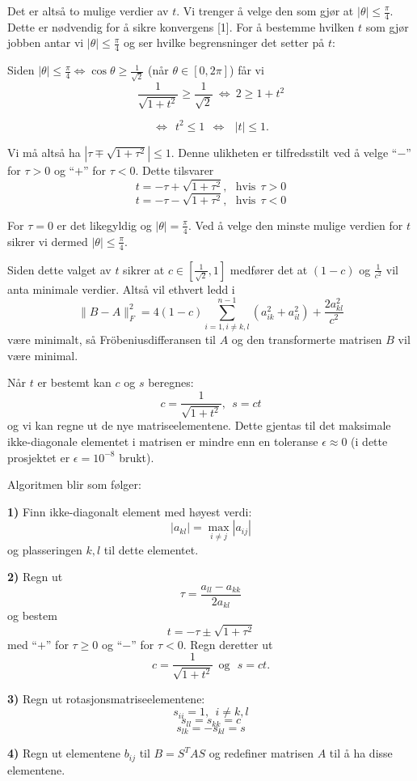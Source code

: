 \documentclass[norsk, 12pt]{article}
\newcommand{\f}{\frac}
\begin{document}
Det er altså to mulige verdier av $t$. Vi trenger å velge den som gjør at $|\theta|\leq\f{\pi}{4}$. Dette er nødvendig
for å sikre konvergens [1]. For å bestemme hvilken $t$ som gjør jobben antar vi $|\theta|\leq\f{\pi}{4}$ og ser hvilke
begrensninger det setter på $t$:

Siden $|\theta|\leq \f{\pi}{4} \Leftrightarrow \cos\theta \geq \f{1}{\sqrt{2}}$ (når $\theta\in [0,2\pi]$) får vi
$$\f{1}{\sqrt{1+t^2}} \geq \f{1}{\sqrt{2}}\  \Leftrightarrow\  2\geq1+t^2$$

$$\Leftrightarrow \ \ t^2\leq 1\ \  \Leftrightarrow\ \ \ |t|\leq1.$$

Vi må altså ha $|\tau\mp\sqrt{1+\tau^2}|\leq1$. Denne ulikheten er tilfredsstilt ved å velge ``$-$'' for $\tau>0$ og ``$+$'' for $\tau<0$.
Dette tilsvarer
$$t = -\tau + \sqrt{1+\tau^2},\ \ \ \text{hvis}\ \ \tau>0$$
$$t = -\tau - \sqrt{1+\tau^2},\ \ \ \text{hvis}\ \ \tau<0$$

For $\tau=0$ er det likegyldig og
$|\theta|= \f{\pi}{4}$. Ved å velge den minste mulige verdien for $t$ sikrer vi dermed $|\theta|\leq\f{\pi}{4}$.

Siden dette valget av $t$ sikrer at $c\in\left[\f{1}{\sqrt{2}}, 1\right]$ medfører det at $(1-c)$ og $\f{1}{c^2}$ vil
anta minimale verdier. Altså vil ethvert ledd i 
$$\|B-A\|_F^2=4(1-c)\sum\limits_{i=1,i\neq k,l}^{n-1}(a_{ik}^2+a_{il}^2)+\f{2a_{kl}^2}{c^2}$$
være minimalt, så Fröbeniusdifferansen til $A$ og den transformerte matrisen $B$ vil være minimal.

Når $t$ er bestemt kan $c$ og $s$ beregnes: $$c = \f{1}{\sqrt{1+t^2}},\ \ s = ct$$
og vi kan regne ut de nye matriseelementene. Dette gjentas til det maksimale ikke-diagonale elementet i matrisen
er mindre enn en toleranse $\epsilon\approx0$ (i dette prosjektet er $\epsilon=10^{-8}$ brukt).

Algoritmen blir som følger:

\textbf{1)} Finn ikke-diagonalt element med høyest verdi: $$|a_{kl}|=\max\limits_{i\neq j}|a_{ij}|$$ og plasseringen $k,l$ til
dette elementet.

\textbf{2)} Regn ut $$\tau=\f{a_{ll}-a_{kk}}{2a_{kl}}$$ og bestem $$t=-\tau\pm\sqrt{1+\tau^2}$$ med ``$+$'' for $\tau\geq0$ og ``$-$'' for 
$\tau<0$. Regn deretter ut $$c = \f{1}{\sqrt{1+t^2}}\ \  \text{og}\ \ \  s=ct.$$

\textbf{3)} Regn ut rotasjonsmatriseelementene: $$s_{ii} = 1,\ \ i\neq k,l$$
$$s_{ll} = s_{kk} = c$$
$$s_{lk}=-s_{kl} = s$$

\textbf{4)} Regn ut elementene $b_{ij}$ til $B = S^{T}AS$ og redefiner matrisen $A$ til å ha disse elementene.
\end{document}
